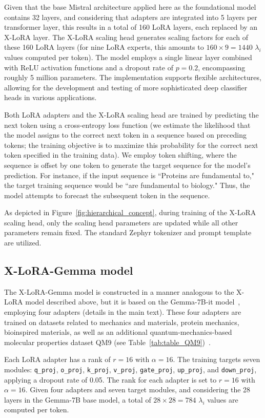 Given that the base Mistral architecture applied here as the foundational model contains 32 layers, and considering that adapters are integrated into 5 layers per transformer layer, this results in a total of 160 LoRA layers, each replaced by an X-LoRA layer. The X-LoRA scaling head generates scaling factors for each of these 160 LoRA layers (for nine LoRA experts, this amounts to $160\times 9=1440$ $\lambda_i$ values computed per token). The model employs a single linear layer combined with ReLU activation functions and a dropout rate of $p=0.2$, encompassing roughly 5 million parameters. The implementation supports flexible architectures, allowing for the development and testing of more sophisticated deep classifier heads in various applications.

Both LoRA adapters and the X-LoRA scaling head are trained by predicting the next token using a cross-entropy loss function (we estimate the likelihood that the model assigns to the correct next token in a sequence based on preceding tokens; the training objective is to maximize this probability for the correct next token specified in the training data). We employ token shifting, where the sequence is offset by one token to generate the target sequence for the model’s prediction. For instance, if the input sequence is ``Proteins are fundamental to," the target training sequence would be ``are fundamental to biology." Thus, the model attempts to forecast the subsequent token in the sequence.

As depicted in Figure~\ref{fig:hierarchical_concept}, during training of the X-LoRA scaling head, only the scaling head parameters are updated while all other parameters remain fixed. The standard Zephyr tokenizer and prompt template are utilized.

\subsection{X-LoRA-Gemma model} The X-LoRA-Gemma model is constructed in a manner analogous to the X-LoRA model described above, but it is based on the Gemma-7B-it model~\cite{Google/gemma-7b-itFace}, employing four adapters (details in the main text). These four adapters are trained on datasets related to mechanics and materials, protein mechanics, bioinspired materials, as well as an additional quantum-mechanics-based molecular properties dataset QM9 (see Table~\ref{tab:table_QM9})~\cite{Ruddigkeit2012EnumerationGDB-17,Ramakrishnan2015ElectronicSpace}.

Each LoRA adapter has a rank of $r=16$ with $\alpha=16$. The training targets seven modules: \texttt{q\_proj}, \texttt{o\_proj}, \texttt{k\_proj}, \texttt{v\_proj}, \texttt{gate\_proj}, \texttt{up\_proj}, and \texttt{down\_proj}, applying a dropout rate of 0.05. The rank for each adapter is set to $r=16$ with $\alpha=16$. Given four adapters and seven target modules, and considering the 28 layers in the Gemma-7B base model, a total of $28\times 28=784$ $\lambda_i$ values are computed per token.


